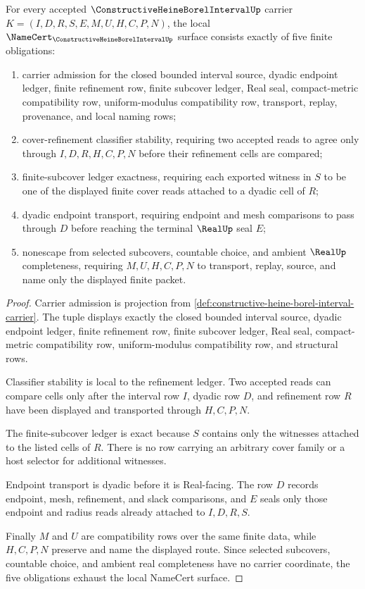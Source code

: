 \begin{theorem}
\label{thm:constructive-heine-borel-interval-namecert-obligations}
For every accepted $\ConstructiveHeineBorelIntervalUp$ carrier $K=(I,D,R,S,E,M,U,H,C,P,N)$, the local $\NameCert_{\ConstructiveHeineBorelIntervalUp}$ surface consists exactly of five finite obligations:
\begin{enumerate}
\item carrier admission for the closed bounded interval source, dyadic endpoint ledger, finite refinement row, finite subcover ledger, Real seal, compact-metric compatibility row, uniform-modulus compatibility row, transport, replay, provenance, and local naming rows;
\item cover-refinement classifier stability, requiring two accepted reads to agree only through $I,D,R,H,C,P,N$ before their refinement cells are compared;
\item finite-subcover ledger exactness, requiring each exported witness in $S$ to be one of the displayed finite cover reads attached to a dyadic cell of $R$;
\item dyadic endpoint transport, requiring endpoint and mesh comparisons to pass through $D$ before reaching the terminal $\RealUp$ seal $E$;
\item nonescape from selected subcovers, countable choice, and ambient $\RealUp$ completeness, requiring $M,U,H,C,P,N$ to transport, replay, source, and name only the displayed finite packet.
\end{enumerate}
\end{theorem}
\begin{proof}
Carrier admission is projection from \autoref{def:constructive-heine-borel-interval-carrier}. The tuple displays exactly the closed bounded interval source, dyadic endpoint ledger, finite refinement row, finite subcover ledger, Real seal, compact-metric compatibility row, uniform-modulus compatibility row, and structural rows.

Classifier stability is local to the refinement ledger. Two accepted reads can compare cells only after the interval row $I$, dyadic row $D$, and refinement row $R$ have been displayed and transported through $H,C,P,N$.

The finite-subcover ledger is exact because $S$ contains only the witnesses attached to the listed cells of $R$. There is no row carrying an arbitrary cover family or a host selector for additional witnesses.

Endpoint transport is dyadic before it is Real-facing. The row $D$ records endpoint, mesh, refinement, and slack comparisons, and $E$ seals only those endpoint and radius reads already attached to $I,D,R,S$.

Finally $M$ and $U$ are compatibility rows over the same finite data, while $H,C,P,N$ preserve and name the displayed route. Since selected subcovers, countable choice, and ambient real completeness have no carrier coordinate, the five obligations exhaust the local NameCert surface.
\end{proof}

